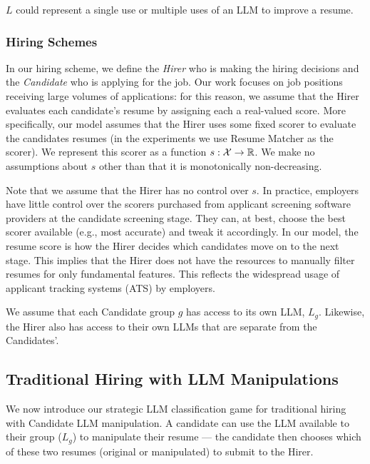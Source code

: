     \begin{remark}
        \(L\) could represent a single use or multiple uses of an LLM to improve a resume.
    \end{remark}

\subsubsection{Hiring Schemes}
    In our hiring scheme, we define the \emph{Hirer} who is making the hiring decisions and the \emph{Candidate} who is applying for the job. Our work focuses on job positions receiving large volumes of applications: for this reason, we assume that the Hirer 
    evaluates 
    each candidate's resume 
    by assigning each a real-valued score. 
    More specifically, our model assumes that the Hirer uses some fixed scorer to evaluate the candidates resumes (in the experiments we use Resume Matcher as the scorer). We represent this scorer as a function \(s:\mathcal{X} \to \mathbb{R}\). We make no assumptions about \(s\) other than that it is monotonically non-decreasing.
    
    Note that we assume that the Hirer has no control over \(s\). In practice, employers have little control over the scorers purchased from applicant screening software providers at the candidate screening stage. They can, at best, choose the best scorer available (e.g., most accurate)  and tweak it accordingly. In our model, the resume score is how the Hirer decides which candidates move on to the next stage. This implies that the Hirer does not have the resources to manually filter resumes for only fundamental features. This reflects the widespread usage of applicant tracking systems (ATS) by employers.
    

    We assume that each Candidate group \(g\) has access to its own LLM, \(L_g\). Likewise, the Hirer also has access to their own LLMs that are separate from the Candidates'.


\subsection{Traditional Hiring with LLM Manipulations}

    We now introduce our strategic LLM classification game for traditional hiring with Candidate LLM manipulation. A candidate can use the LLM available to their group (\(L_g\)) to manipulate their resume --- the candidate then chooses which of these two resumes (original or manipulated) to submit to the Hirer.
        
